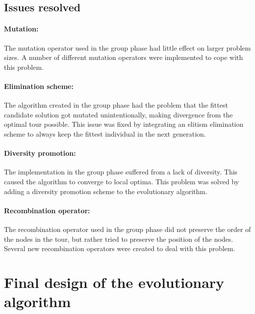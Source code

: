 \documentclass[a4paper,10pt]{article}
\newcommand{\ReplaceMe}[1]{{\color{blue}#1}}
\newcommand{\RemoveMe}[1]{{\color{purple}#1}}
\begin{document}
\subsection{Issues resolved}

\paragraph{Mutation:} The mutation operator used in the group phase had little effect on larger problem sizes. A number of different mutation operators were implemented to cope with this problem.

\paragraph{Elimination scheme:} The algorithm created in the group phase had the problem that the fittest candidate solution got mutated unintentionally, making divergence from the optimal tour possible. This issue was fixed by integrating an elitism elimination scheme to always keep the fittest individual in the next generation.

\paragraph{Diversity promotion:} The implementation in the group phase suffered from a lack of diversity. This caused the algorithm to converge to local optima. This problem was solved by adding a diversity promotion scheme to the evolutionary algorithm.

\paragraph{Recombination operator:} The recombination operator used in the group phase did not preserve the order of the nodes in the tour, but rather tried to preserve the position of the nodes. Several new recombination operators were created to deal with this problem.

\section{Final design of the evolutionary algorithm}  \label{sec:evolutionary algorithm}

\end{document}
